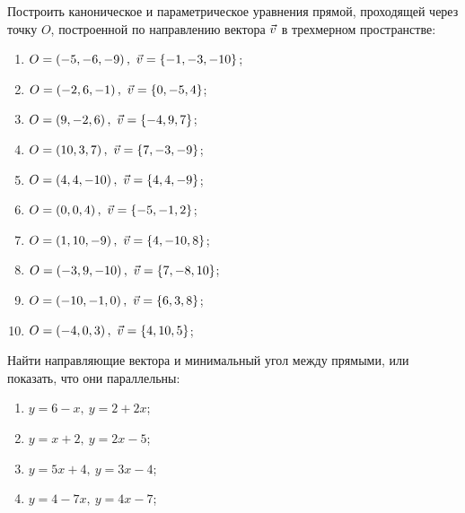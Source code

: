 	\pagebreak
	Построить каноническое и параметрическое уравнения прямой, проходящей через точку $O$, построенной по направлению вектора $\vec{v}$ в трехмерном пространстве:

	\begin{enumerate}
		\setcounter{enumi}{\value{tasks}}

			\item \( \displaystyle O = \left( -5, -6, -9 \right), ~ \vec{v} = \left\lbrace -1, -3, -10 \right\rbrace \);
			\item \( \displaystyle O = \left( -2, 6, -1 \right), ~ \vec{v} = \left\lbrace 0, -5, 4 \right\rbrace \);
			\item \( \displaystyle O = \left( 9, -2, 6 \right), ~ \vec{v} = \left\lbrace -4, 9, 7 \right\rbrace \);
			\item \( \displaystyle O = \left( 10, 3, 7 \right), ~ \vec{v} = \left\lbrace 7, -3, -9 \right\rbrace \);
			\item \( \displaystyle O = \left( 4, 4, -10 \right), ~ \vec{v} = \left\lbrace 4, 4, -9 \right\rbrace \);
			\item \( \displaystyle O = \left( 0, 0, 4 \right), ~ \vec{v} = \left\lbrace -5, -1, 2 \right\rbrace \);
			\item \( \displaystyle O = \left( 1, 10, -9 \right), ~ \vec{v} = \left\lbrace 4, -10, 8 \right\rbrace \);
			\item \( \displaystyle O = \left( -3, 9, -10 \right), ~ \vec{v} = \left\lbrace 7, -8, 10 \right\rbrace \);
			\item \( \displaystyle O = \left( -10, -1, 0 \right), ~ \vec{v} = \left\lbrace 6, 3, 8 \right\rbrace \);
			\item \( \displaystyle O = \left( -4, 0, 3 \right), ~ \vec{v} = \left\lbrace 4, 10, 5 \right\rbrace \);

		\setcounter{tasks}{\value{enumi}}
	\end{enumerate}

	\vspace{15pt}
	Найти направляющие вектора и минимальный угол между прямыми, или показать, что они параллельны:

	\begin{multicols}{2}
		\begin{enumerate}
			\setcounter{enumi}{\value{tasks}}

				\item \( \displaystyle y = 6 - x, ~ y = 2 + 2x \);
				\item \( \displaystyle y = x + 2, ~ y = 2x - 5 \);
				\item \( \displaystyle y = 5x + 4, ~ y = 3x - 4  \);
				\item \( \displaystyle y = 4 - 7x, ~ y = 4x - 7 \);

			\setcounter{tasks}{\value{enumi}}
		\end{enumerate}
	\end{multicols}


